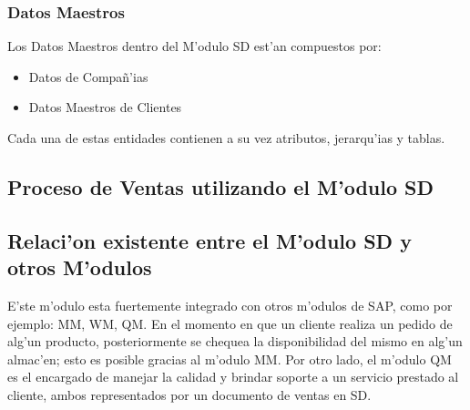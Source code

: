 \subsubsection{Datos Maestros}
Los Datos Maestros dentro del M'odulo SD est'an compuestos por:
\begin{itemize}
\item Datos de Compa\~n'ias
\item Datos Maestros de Clientes
\end{itemize}
Cada una de estas entidades contienen a su vez atributos, jerarqu'ias y tablas.

\subsection{Proceso de Ventas utilizando el M'odulo SD}

\subsection{Relaci'on existente entre el M'odulo SD y otros M'odulos}
E'ste m'odulo esta fuertemente integrado con otros m'odulos de SAP, como por ejemplo: MM, WM, QM. 
En el momento en que un cliente realiza un pedido de alg'un producto, posteriormente se chequea la disponibilidad del mismo en alg'un almac'en; esto es posible gracias al m'odulo MM. 
Por otro lado, el m'odulo QM es el encargado de manejar la calidad y brindar soporte a un servicio prestado al cliente, ambos representados por un documento de ventas en SD. 


